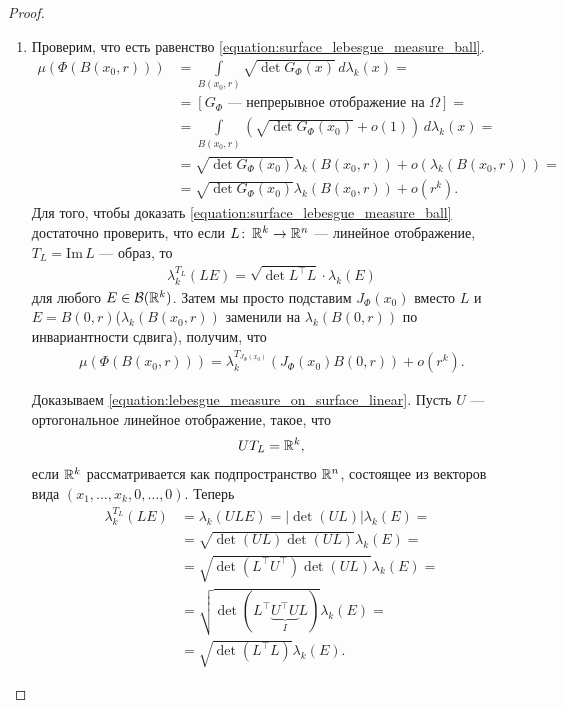 \begin{proof}
\begin{enumerate}
 \item Проверим, что есть равенство \eqref{equation:surface_lebesgue_measure_ball}.
  \begin{align*}
   \mu(\Phi(B(x_0,r))) &= \int\limits_{B(x_0, r)} \sqrt{\det G_{\Phi}(x)} \, d\lambda_k(x) = \\
   &= [G_{\Phi} \text{ --- непрерывное отображение на } \Omega] = \\
   &= \int\limits_{B(x_0,r)} \left( \sqrt{ \det G_{\Phi}(x_0) } + o(1) \right) \, d\lambda_{k}(x) = \\
   &= \sqrt{\det G_{\Phi}(x_0)} \lambda_k(B(x_0, r)) + o(\lambda_k(B(x_0, r))) = \\
   &= \sqrt{ \det G_{\Phi}(x_0)  } \lambda_k(B(x_0, r)) + o(r^{k})
  .\end{align*} Для того, чтобы доказать \eqref{equation:surface_lebesgue_measure_ball} достаточно проверить, что если $L \colon\, \mathbb{R}^{k} \to \mathbb{R}^{n} $ --- линейное отображение, $T_L = \mathrm{Im}\,L$ --- образ, то
  \begin{align}
   \label{equation:lebesgue_measure_on_surface_linear}
   \lambda_k^{T_L}(LE) = \sqrt{\det L^{\top}L} \cdot \lambda_k(E)
  \end{align} для любого $E \in \mathcal{B}(\mathbb{R}^{k})$. Затем мы просто подставим $J_{\Phi}(x_0)$ вместо $L$ и $E = B(0, r)$($\lambda_k(B(x_0, r))$ заменили на $\lambda_k(B(0, r))$ по инвариантности сдвига), получим, что
  \begin{align*}
	  \mu(\Phi(B(x_0, r))) = \lambda_k^{T_{J_\Phi(x_0)}} (J_{\Phi}(x_0) B(0, r)) + o(r^{k})
  .\end{align*}

  Доказываем \eqref{equation:lebesgue_measure_on_surface_linear}. Пусть $U$ --- ортогональное линейное отображение, такое, что
  \begin{align*}
   UT_L = \mathbb{R}^{k}
  ,\end{align*} если $\mathbb{R}^{k}$ рассматривается как подпространство $\mathbb{R}^{n}$, состоящее из векторов вида $(x_1, \ldots, x_k, 0, \ldots, 0)$. Теперь
  \begin{align*}
   \lambda_k^{T_L}(LE) &= \lambda_k(ULE) = \left| \det (UL) \right| \lambda_k(E) = \\ &= \sqrt{\det(UL)\det(UL)} \lambda_k(E) = \\
   &= \sqrt{\det(L^{\top}U^{\top}) \det(UL)} \lambda_k(E) = \\
   &= \sqrt{ \det(L^{\top}\underbrace{U^{\top}U}_{I}L) } \lambda_k(E) = \\
   &= \sqrt{ \det (L^{\top} L) } \lambda_k(E)
  .\end{align*} 


\end{enumerate}
\end{proof}
